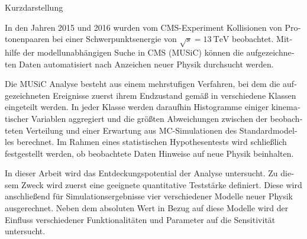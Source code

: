 
\vspace{1cm}
{Kurzdarstellung}
\chapterheadendvskip

\begin{otherlanguage}{german}
In den Jahren 2015 und 2016 wurden vom \acs{CMS}-Experiment Kollisionen von Protonenpaaren bei einer Schwerpunktsenergie von $\sqrt{s} = \SI{13}{\TeV}$ beobachtet. Mithilfe der modellunabhängigen Suche in \acs{CMS} (\ac{MUSiC}) können die aufgezeichneten Daten automatisiert nach Anzeichen neuer Physik durchsucht werden.

Die \ac{MUSiC} Analyse besteht aus einem mehrstufigen Verfahren, bei dem die aufgezeichneten Ereignisse zuerst ihrem Endzustand gemäß in verschiedene Klassen eingeteilt werden. In jeder Klasse werden daraufhin Histogramme einiger kinematischer Variablen aggregiert und die größten Abweichungen zwischen der beobachteten Verteilung und einer Erwartung aus \acl{MC}-Simulationen des Standardmodelles berechnet. Im Rahmen eines statistischen Hypothesentests wird schließlich festgestellt werden, ob beobachtete Daten Hinweise auf neue Physik beinhalten.

In dieser Arbeit wird das Entdeckungspotential der Analyse untersucht. Zu diesem Zweck wird zuerst eine geeignete quantitative Teststärke definiert. Diese wird anschließend für Simulationsergebnisse vier verschiedener Modelle neuer Physik ausgerechnet. Neben dem absoluten Wert in Bezug auf diese Modelle wird der Einfluss verschiedener Funktionalitäten und Parameter auf die Sensitivität untersucht.
\end{otherlanguage}